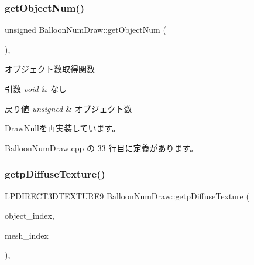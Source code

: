 \subsubsection{\texorpdfstring{get\+Object\+Num()}{getObjectNum()}}
{\footnotesize\ttfamily unsigned Balloon\+Num\+Draw\+::get\+Object\+Num (\begin{DoxyParamCaption}{ }\end{DoxyParamCaption})\hspace{0.3cm}{\ttfamily [override]}, {\ttfamily [virtual]}}



オブジェクト数取得関数 


\begin{DoxyParams}{引数}
{\em void} & なし \\
\hline
\end{DoxyParams}

\begin{DoxyRetVals}{戻り値}
{\em unsigned} & オブジェクト数 \\
\hline
\end{DoxyRetVals}


\mbox{\hyperlink{class_draw_null_a8bddfa6ee87e47b2ecbbe6803b088e37}{Draw\+Null}}を再実装しています。



 Balloon\+Num\+Draw.\+cpp の 33 行目に定義があります。

\mbox{\label{class_balloon_num_draw_a1bf5721e82b99cdfd5550262f560da95}} 
\subsubsection{\texorpdfstring{getp\+Diffuse\+Texture()}{getpDiffuseTexture()}}
{\footnotesize\ttfamily L\+P\+D\+I\+R\+E\+C\+T3\+D\+T\+E\+X\+T\+U\+R\+E9 Balloon\+Num\+Draw\+::getp\+Diffuse\+Texture (\begin{DoxyParamCaption}\item[{unsigned}]{object\+\_\+index,  }\item[{unsigned}]{mesh\+\_\+index }\end{DoxyParamCaption})\hspace{0.3cm}{\ttfamily [override]}, {\ttfamily [virtual]}}



